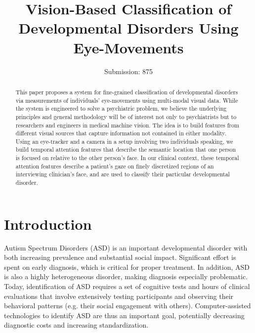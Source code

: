 \documentclass{llncs}
\begin{document}
  \title{Vision-Based Classification of Developmental Disorders Using Eye-Movements}
  \author{Submission: 875}
  \institute{}


  \maketitle

  \begin{abstract}
    This paper proposes a system for fine-grained classification of developmental disorders via measurements of individuals' eye-movements using multi-modal visual data. While the system is engineered to solve a psychiatric problem, we believe the underlying principles and general methodology will be of interest not only to psychiatrists but to researchers and engineers in medical machine vision. The idea is to build features from different visual sources that capture information not contained in either modality. Using an eye-tracker and a camera in a setup involving two individuals speaking, we build temporal attention features that describe the semantic location that one person is focused on relative to the other person's face. In our clinical context, these temporal attention features describe a patient's gaze on finely discretized regions of an interviewing clinician's face, and are used to classify their particular developmental disorder.
  \end{abstract}

  \vspace{-2.5em}
  \section{Introduction}
  \vspace{-1em}
  Autism Spectrum Disorders (ASD) is an important developmental disorder with both increasing prevalence and substantial social impact. Significant effort is spent on early diagnosis, which is critical for proper treatment. In addition, ASD is also a highly heterogeneous disorder, making diagnosis especially problematic. Today, identification of ASD requires a set of cognitive tests and hours of clinical evaluations that involve extensively testing participants and observing their behavioral patterns (e.g. their social engagement with others). Computer-assisted technologies to identify ASD are thus an important goal, potentially decreasing diagnostic costs and increasing standardization.
\end{document}
